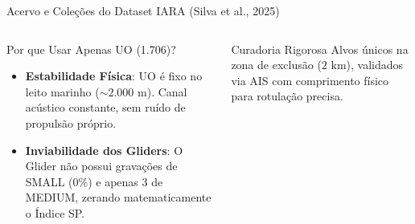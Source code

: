 \documentclass[aspectratio=169]{beamer}
\begin{document}
\begin{frame}{Acervo e Cole\c{c}\~{o}es do Dataset IARA (Silva et al., 2025)}
\begin{columns}[t]
        \begin{block}{\small Por que Usar Apenas UO (1.706)?}
            \scriptsize
            \begin{itemize}
                \item \textbf{Estabilidade F\'{i}sica}: UO \'{e} fixo no leito marinho ($\sim 2.000\text{ m}$). Canal ac\'{u}stico constante, sem ru\'{i}do de propuls\~{a}o pr\'{o}prio.
                \item \textbf{Inviabilidade dos Gliders}: O Glider n\~{a}o possui grava\c{c}\~{o}es de SMALL (0\%) e apenas 3 de MEDIUM, zerando matematicamente o \'{I}ndice SP.
            \end{itemize}
        \end{block}
        
        \vspace{0.06cm}
        \begin{block}{\small Curadoria Rigorosa}
            \scriptsize
            Alvos \'{u}nicos na zona de exclus\~{a}o ($2\text{ km}$), validados via AIS com comprimento f\'{i}sico para rotula\c{c}\~{a}o precisa.
        \end{block}
    \end{columns}
\end{frame}
\end{document}
